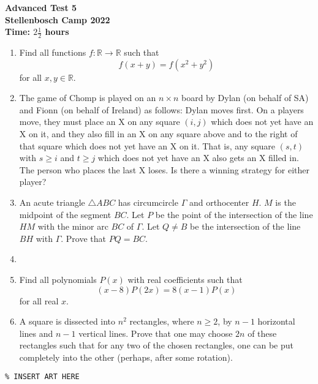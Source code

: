 \documentclass{article}
\begin{document}
\thispagestyle{empty}

\begin{center}
  \textbf{\Large Advanced Test 5}
  \\ \vspace{1em}
  \textbf{\large Stellenbosch Camp 2022}
  \\ \vspace{1em}
  \textbf{\large Time: $2\frac{1}{2}$ hours}
\end{center}

\bigskip \bigskip

\begin{enumerate}[itemsep=\fill]

\item %
Find all functions $f : \mathbb{R} \to \mathbb{R}$ such that \[ f(x+y) = f(x^2+y^2) \] for all $x,y \in \mathbb{R}$.

 
\item %
The game of Chomp is played on an $n \times n$ board by Dylan (on behalf of SA) and Fionn (on behalf of Ireland) as follows: Dylan moves first.
On a players move, they must place an X on any square $(i, j)$ which does not yet have an X on it, and they also fill in an X on any square above and to the right of that square which does not yet have an X on it.
That is, any square $(s, t)$ with $s \geq i$ and $t \geq j$ which does not yet have an X also gets an X filled in.
The person who places the last X loses.
Is there a winning strategy for either player?


\item %
An acute triangle $\triangle ABC$ has circumcircle $\Gamma$ and orthocenter $H$.
$M$ is the midpoint of the segment $BC$.
Let $P$ be the point of the intersection of the line $HM$ with the minor arc $BC$ of $\Gamma$.
Let $Q \neq B$ be the intersection of the line $BH$ with $\Gamma$.
Prove that $PQ = BC$.


\item %


\item %
Find all polynomials $P(x)$ with real coefficients such that
\[ (x-8)P(2x) = 8(x-1)P(x) \]
for all real $x$.


\item %
A square is dissected into $n^2$ rectangles, where $n\geq 2$, by $n-1$ horizontal lines and $n-1$ vertical lines. Prove that one may choose $2n$ of these rectangles such that for any two of the chosen rectangles, one can be put completely into the other (perhaps, after some rotation).

\end{enumerate}


\vfill
\centering
\small
\begin{BVerbatim}
\end{BVerbatim}
\end{document}
